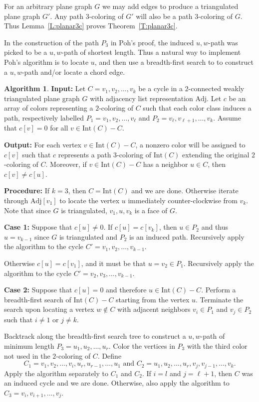 \documentclass[12pt,letterpaper]{article}
\theoremstyle{plain}
\theoremstyle{definition}
\theoremstyle{break}
\newtheorem{algorithm}[lemma]{Algorithm}     %
\begin{document}
For an arbitrary plane graph $G$ we may add edges
to produce a triangulated plane graph $G'$. Any path $3$-coloring of
$G'$ will also be a path $3$-coloring of $G$. Thus Lemma~\ref{L:planar3c}
proves Theorem~\ref{T:planar3c}.

In the construction of the path $P_3$ in Poh's proof, the
induced $u,w$-path was picked to be a $u,w$-path of shortest length.
Thus a natural way to implement Poh's algorithm is to locate $u$,
and then use a breadth-first search to
to construct a $u,w$-path and/or locate
a chord edge.

\begin{algorithm}\label{A:poh_bfs}
\textbf{Input:} Let $C=v_1,v_2,\ldots,v_k$ be a cycle in a $2$-connected
weakly triangulated plane
graph $G$ with adjacency list representation $\text{Adj}$. Let 
$c$ be an array of colors representing a $2$-coloring of $C$ such
that each color class induces a path, respectively labelled
$P_1=v_1,v_2,\ldots,v_\ell$ and $P_2=v_\ell,v_{\ell+1},\ldots,v_k$. Assume that
$c[v]=0$ for all $v\in\text{Int}(C)-C$.

\textbf{Output:} For each vertex $v\in\text{Int}(C)-C$, a nonzero color will be
assigned to $c[v]$ such that $c$ represents a path $3$-coloring of
$\text{Int}(C)$ extending the original $2$-coloring of $C$. Moreover, if
$v\in \text{Int}(C)-C$ has a neighbor $u\in C$, then $c[v]\ne c[u]$.

\textbf{Procedure:} If $k=3$, then $C=\text{Int}(C)$ and we are done. Otherwise
iterate through $\text{Adj}[v_1]$ to locate the vertex $u$
immediately counter-clockwise from $v_k$. Note that since $G$ is triangulated,
$v_1,u,v_k$ is a face of $G$.

\textbf{Case 1:} Suppose that $c[u]\ne 0$. If $c[u]=c[v_k]$,
then $u\in P_2$ and
thus $u=v_{k-1}$ since $G$ is
triangulated and $P_2$ is an induced path. Recursively
apply the algorithm to the cycle $C'=v_1,v_2,\ldots,v_{k-1}$.

Otherwise $c[u]=c[v_1]$, and it must be that $u=v_2\in P_1$. Recursively
apply the algorithm to the cycle $C'=v_2,v_3,\ldots,v_{k-1}$.

\textbf{Case 2:} Suppose that $c[u]=0$ and therefore $u\in \text{Int}(C)-C$.
Perform a breadth-first search of $\text{Int}(C)-C$ starting from the
vertex $u$. Terminate the search upon locating a vertex $w\not\in C$ with
adjacent
neighbors $v_i\in P_1$ and $v_j\in P_2$ such that $i\ne 1$ or $j\ne k$.

Backtrack along the breadth-first search tree
to construct a $u,w$-path of minimum length $P_3=u_1,u_2,\ldots,u_r$.
Color the vertices in
$P_3$ with the third color not used in the $2$-coloring of $C$.
Define
$$C_1=v_1,v_2,\ldots,v_i,u_r,u_{r-1},\ldots,u_1 \text{ and }
C_2=u_1,u_2,\ldots,u_r,v_j,v_{j-1},\ldots,v_k.$$
Apply the algorithm
separately to $C_1$ and $C_2$. If $i=l$ and $j={\ell+1}$, then $C$ was an
induced cycle and we are done. Otherwise, also apply the algorithm to
$C_3=v_i,v_{i+1},\ldots,v_j$.
\end{algorithm}
\end{document}
